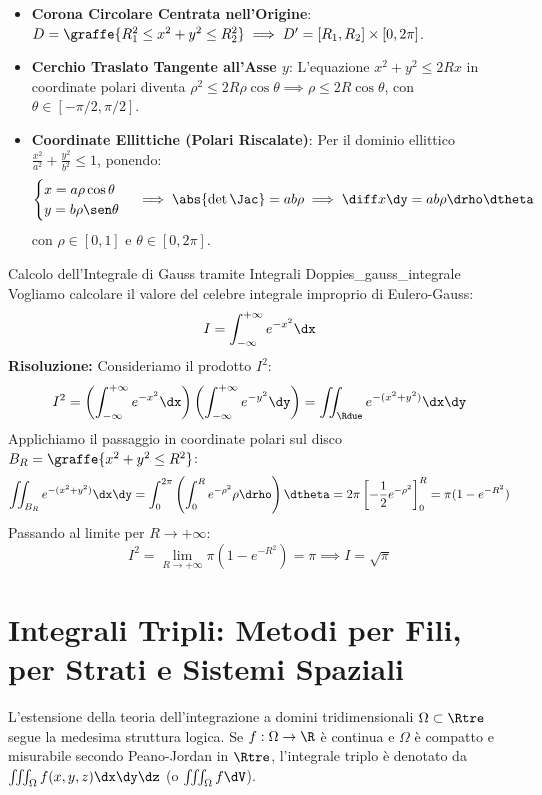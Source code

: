 \begin{metodo}
\begin{itemize}
    \item \textbf{Corona Circolare Centrata nell'Origine}:
    $D = \graffe{R_1^2 \le x^2 + y^2 \le R_2^2} \implies D' = [R_1, R_2] \times [0, 2\pi]$.
    \item \textbf{Cerchio Traslato Tangente all'Asse $y$}:
    L'equazione $x^2 + y^2 \le 2R x$ in coordinate polari diventa $\rho^2 \le 2R \rho \cos\theta \implies \rho \le 2R \cos\theta$, con $\theta \in [-\pi/2, \pi/2]$.
    \item \textbf{Coordinate Ellittiche (Polari Riscalate)}:
    Per il dominio ellittico $\frac{x^2}{a^2} + \frac{y^2}{b^2} \le 1$, ponendo:
    \[
    \begin{cases} x = a \rho \cos\theta \\ y = b \rho \sen\theta \end{cases} \implies \abs{\det \Jac} = a b \rho \implies \diff x \dy = a b \rho \drho \dtheta
    \]
    con $\rho \in [0,1]$ e $\theta \in [0, 2\pi]$.
\end{itemize}
\end{metodo}

\begin{esempio}{Calcolo dell'Integrale di Gauss tramite Integrali Doppi}{es_gauss_integrale}
Vogliamo calcolare il valore del celebre integrale improprio di Eulero-Gauss:
\[
I = \int_{-\infty}^{+\infty} e^{-x^2} \dx
\]
\textbf{Risoluzione:}
Consideriamo il prodotto $I^2$:
\[
I^2 = \left( \int_{-\infty}^{+\infty} e^{-x^2} \dx \right) \left( \int_{-\infty}^{+\infty} e^{-y^2} \dy \right) = \iint_{\Rdue} e^{-(x^2+y^2)} \dx\dy
\]
Applichiamo il passaggio in coordinate polari sul disco $B_R = \graffe{x^2+y^2 \le R^2}$:
\[
\iint_{B_R} e^{-(x^2+y^2)} \dx\dy = \int_{0}^{2\pi} \left( \int_{0}^{R} e^{-\rho^2} \rho \drho \right) \dtheta = 2\pi \left[ -\frac{1}{2} e^{-\rho^2} \right]_0^R = \pi (1 - e^{-R^2})
\]
Passando al limite per $R \to +\infty$:
\[
I^2 = \lim_{R \to +\infty} \pi (1 - e^{-R^2}) = \pi \implies I = \sqrt{\pi}
\]
\end{esempio}

\section{Integrali Tripli: Metodi per Fili, per Strati e Sistemi Spaziali}

L'estensione della teoria dell'integrazione a domini tridimensionali $\Omega \subset \Rtre$ segue la medesima struttura logica. Se $f: \Omega \to \R$ è continua e $\Omega$ è compatto e misurabile secondo Peano-Jordan in $\Rtre$, l'integrale triplo è denotato da $\iiint_\Omega f(x,y,z) \dx\dy\dz$ (o $\iiint_\Omega f \dV$).

